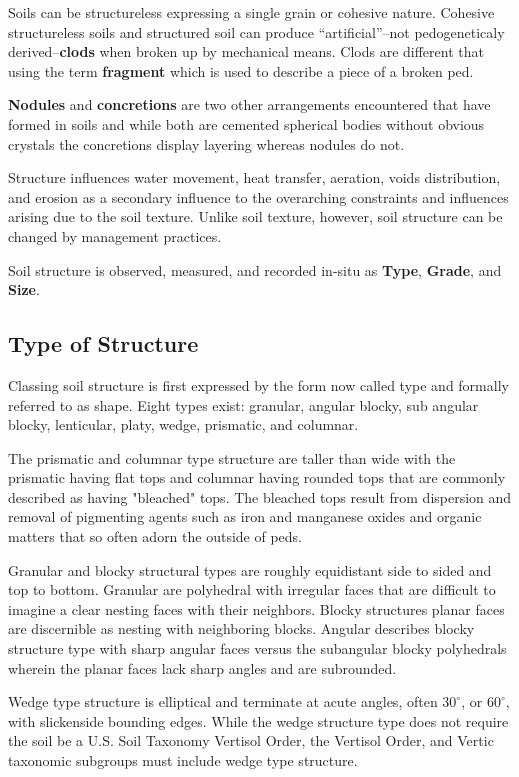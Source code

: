 \documentclass[a5paper]{book}
\begin{document}
Soils can be structureless expressing a single grain or cohesive nature. Cohesive structureless soils and structured soil can produce “artificial”–not pedogeneticaly derived–\textbf{clods} when broken up by mechanical means. Clods are different that using the term \textbf{fragment} which is used to describe a piece of a broken ped.
    
\textbf{Nodules} and \textbf{concretions} are two other arrangements encountered that have formed in soils and while both are cemented spherical bodies without obvious crystals the concretions display layering whereas nodules do not.
    
Structure influences water movement, heat transfer, aeration, voids distribution, and erosion as a secondary influence to the overarching constraints and influences arising due to the soil texture. Unlike soil texture, however, soil structure can be changed by management practices.
    
Soil structure is observed, measured, and recorded in-situ as \textbf{Type}, \textbf{Grade}, and \textbf{Size}.
    
\subsection{Type of Structure}
    
Classing soil structure is first expressed by the form now called type and formally referred to as shape. Eight types exist: granular, angular blocky, sub angular blocky, lenticular, platy, wedge, prismatic, and columnar.

The prismatic and columnar type structure are taller than wide with the prismatic having flat tops and columnar having rounded tops that are commonly described as having "bleached" tops. The bleached tops result from dispersion and removal of pigmenting agents such as iron and manganese oxides and organic matters that so often adorn the outside of peds.

Granular and blocky structural types are roughly equidistant side to sided and top to bottom. Granular are polyhedral with irregular faces that are difficult to imagine a clear nesting faces with their neighbors. Blocky structures planar faces are discernible as nesting with neighboring blocks. Angular describes blocky structure type with sharp angular faces versus the subangular blocky polyhedrals wherein the planar faces lack sharp angles and are subrounded.

Wedge type structure is elliptical and terminate at acute angles, often $30^{\circ}$, or $60^{\circ}$, with slickenside bounding edges. While the wedge structure type does not require the soil be a U.S. Soil Taxonomy Vertisol Order, the Vertisol Order, and Vertic taxonomic subgroups must include wedge type structure.
\end{document}

